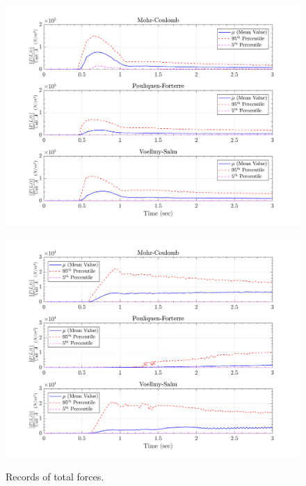 \documentclass{article}
\begin{document}
\begin{figure}[H]
	\begin{minipage}[b]{0.5\linewidth}
    	\centering
    	\includegraphics[width=1\textwidth]{InclinedPlane/LocalRecords/Records/Ftotal_L15.png}
    	\label{fig:Ramp-L3-Ftot}
	\end{minipage}
	\begin{minipage}[b]{0.5\linewidth}
		\centering
		\includegraphics[width=1\textwidth]{InclinedPlane/LocalRecords/Records/Ftotal_L17.png}
    	\label{fig:Ramp-L4-Ftot}
    \end{minipage}
    \caption{Records of total forces.}
    \label{fig:Ramp-LM-Ftot}
\end{figure}
\end{document}
